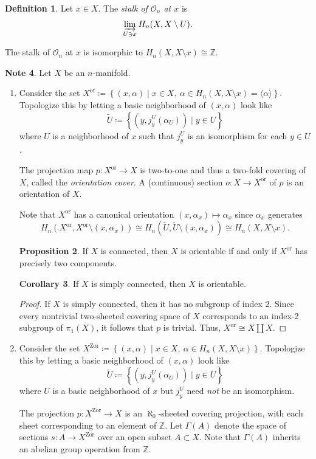 \documentclass[10pt,letterpaper,cm]{nupset}
\theoremstyle{definition}
\newtheorem{definition}{Definition}[subsection]
\newtheorem{note}[definition]{Note}
\theoremstyle{theorem}
\newtheorem{prop}[definition]{Proposition}
\newtheorem{corollary}[definition]{Corollary}
\theoremstyle{remark}
\newcommand{\Z}{\mathbb Z}
\newcommand{\1}{\mathbb{1}}
\newcommand{\0}{\vec 0}
\begin{document}
\begin{definition}
Let $x\in X$. The \textit{stalk of $\mathcal{O}_n$ at $x$} is  $$\varinjlim_{U\ni x} H_n(X, X \setminus U).$$
\end{definition}


The stalk of $\mathcal{O}_n$ at $x$ is isomorphic to $H_n(X, X \setminus x) \cong \Z$.


\begin{note}
Let $X$ be an $n$-manifold.
\begin{enumerate}
\item Consider the set $X^{\mathrm{or}} \coloneqq  \left\{(x, \alpha) \mid x\in X, \ \alpha \in H_n(X, X \setminus x) =\langle \alpha \rangle \right\}$. Topologize this by letting a basic neighborhood of $\left(x, \alpha\right)$ look like $$\widetilde{U}\coloneqq  \left\{(y, j_y^U(\alpha_U)) \mid y \in U\right\}$$ where $U$ is a neighborhood of $x$ such that $j_y^U$ is an isomorphism for each $y\in U$.

The projection map $p: X^{\mathrm{or}} \to X$ is two-to-one and thus a two-fold covering of $X$, called the \textit{orientation cover}. A (continuous) section $o: X \to X^{\mathrm{or}}$ of $p$ is an orientation of $X$.

Note that $X^{\mathrm{or}}$ has a canonical orientation $\left(x, \alpha_x\right) \mapsto \alpha_x$ since $\alpha_x$ generates $$H_n(X^{\mathrm{or}}, X^{\mathrm{or}} \setminus (x, \alpha_x)) \cong H_n\left(\widetilde{U}, \widetilde{U} \setminus (x, \alpha_x)\right) \cong H_n(X, X \setminus x).$$
\begin{prop}
If $X$ is connected, then $X$ is orientable if and only if $X^{\mathrm{or}}$ has precisely two components. 
\end{prop}
\begin{corollary}
If $X$ is simply connected, then $X$ is orientable. 
\end{corollary}
\begin{proof}
If $X$ is simply connected, then it has no subgroup of index $2$. Since every nontrivial two-sheeted covering space of $X$ corresponds to an index-2 subgroup of $\pi_1(X)$, it follows that $p$ is trivial. Thus, $X^{\mathrm{or}} \cong X \coprod X$. 
\end{proof}
\item Consider the set $X^{\mathrm{Zor}} \coloneqq  \left\{(x, \alpha) \mid x\in X, \ \alpha \in H_n(X, X \setminus x) \right\}$. Topologize this by letting a basic neighborhood of $\left(x, \alpha\right)$ look like $$\widetilde{U}\coloneqq  \left\{(y, j_y^U(\alpha_U)) \mid y \in U\right\}$$ where $U$ is a basic neighborhood of $x$ but $j_y^U$ need \emph{not} be an isomorphism. 

The projection $p: X^{\mathrm{Zor}} \to X$ is an $\aleph_0$-sheeted covering projection, with each sheet corresponding to an element of $\Z$. Let  $\Gamma(A)$ denote the space of sections $s: A \to X^{\mathrm{Zor}}$ over an open subset $A\subset X$. Note that $\Gamma(A)$ inherits an abelian group operation from $\Z$. 
\end{enumerate}
\end{note}
\end{document}
